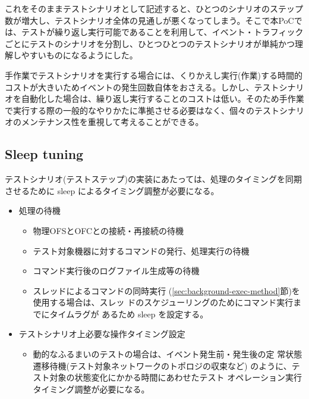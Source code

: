 これをそのままテストシナリオとして記述すると、ひとつのシナリオのステップ
数が増大し、テストシナリオ全体の見通しが悪くなってしまう。そこで本PoCで
は、テストが繰り返し実行可能であることを利用して、イベント・トラフィック
ごとにテストのシナリオを分割し、ひとつひとつのテストシナリオが単純かつ理
解しやすいものになるようにした。

手作業でテストシナリオを実行する場合には、くりかえし実行(作業)する時間的
コストが大きいためイベントの発生回数自体をおさえる。しかし、テストシナリ
オを自動化した場合は、繰り返し実行することのコストは低い。そのため手作業
で実行する際の一般的なやりかたに準拠させる必要はなく、個々のテストシナリ
オのメンテナンス性を重視して考えることができる。

  \subsection{Sleep tuning}
  \label{sec:sleep-tuning}

テストシナリオ(テストステップ)の実装にあたっては、処理のタイミングを同期
させるために sleep によるタイミング調整が必要になる。
\begin{itemize}
 \item 処理の待機
       \begin{itemize}
        \item 物理OFSとOFCとの接続・再接続の待機
        \item テスト対象機器に対するコマンドの発行、処理実行の待機
        \item コマンド実行後のログファイル生成等の待機
        \item スレッドによるコマンドの同時実行
              (\ref{sec:background-exec-method}節)を使用する場合は、スレッ
              ドのスケジューリングのためにコマンド実行までにタイムラグが
              あるため sleep を設定する。
       \end{itemize}
 \item テストシナリオ上必要な操作タイミング設定
       \begin{itemize}
        \item 動的なふるまいのテストの場合は、イベント発生前・発生後の定
              常状態遷移待機(テスト対象ネットワークのトポロジの収束など)
              のように、テスト対象の状態変化にかかる時間にあわせたテスト
              オペレーション実行タイミング調整が必要になる。
       \end{itemize}
\end{itemize}

